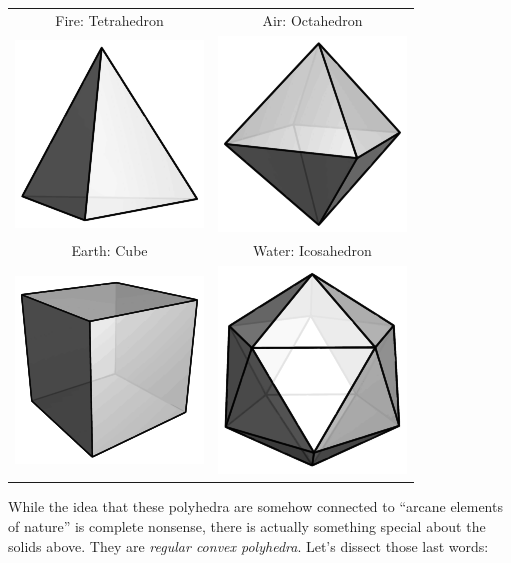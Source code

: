 \begin{center}
\begin{tabular}{|c|c|}
\hline
Fire: Tetrahedron & Air: Octahedron \\
\includegraphics{../graphics/tetrahedron.pdf} 
& \includegraphics{../graphics/octahedron.pdf} 
\\
\hline 
 Earth: Cube & Water: Icosahedron \\
\includegraphics{../graphics/cube.pdf} 
& \includegraphics{../graphics/icosahedron.pdf}  
\\
\hline
\end{tabular}
\end{center}
While the idea that these polyhedra are somehow connected to ``arcane
elements of nature'' is complete nonsense, there is actually something
special about the solids above. They are \textit{regular convex
  polyhedra}. Let's dissect those last words:

